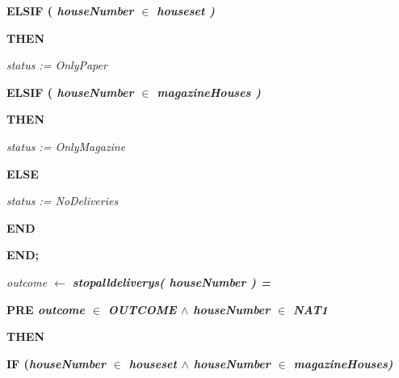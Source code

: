 \documentclass[11pt]{article}
\begin{document}
\begin{sloppypar}
\hspace*{0.20in}

\hspace*{0.80in}\bf ELSIF \rm ( \it houseNumber  $\in$  \it houseset \rm )\hspace*{0.10in}

\hspace*{0.80in}\bf THEN\hspace*{0.15in}

\hspace*{1.10in}\it status \rm := \it OnlyPaper\hspace*{0.10in}

\hspace*{0.20in}

\hspace*{0.80in}\bf ELSIF \rm ( \it houseNumber  $\in$  \it magazineHouses \rm )\hspace*{0.10in}

\hspace*{0.80in}\bf THEN\hspace*{0.10in}

\hspace*{1.10in}\it status \rm := \it OnlyMagazine

\hspace*{0.80in}\bf ELSE

\hspace*{1.10in}\it status \rm := \it NoDeliveries

\hspace*{0.80in}\bf END

\hspace*{0.60in}\bf END\rm ;

\hspace*{0.40in}

\hspace*{0.40in}\it outcome  $\leftarrow$  \bf stopalldeliverys\rm ( \it houseNumber \rm ) \rm =

\hspace*{0.60in}\bf PRE \it outcome  $\in$  \it OUTCOME\hspace*{0.10in} $\land$ \hspace*{0.10in}\it houseNumber  $\in$  \bf NAT1\hspace*{0.10in}

\hspace*{0.60in}\bf THEN

\hspace*{0.80in}\bf IF \rm (\it houseNumber  $\in$  \it houseset  $\land$  \it houseNumber  $\in$  \it magazineHouses\rm )


\end{sloppypar}
\end{document}
